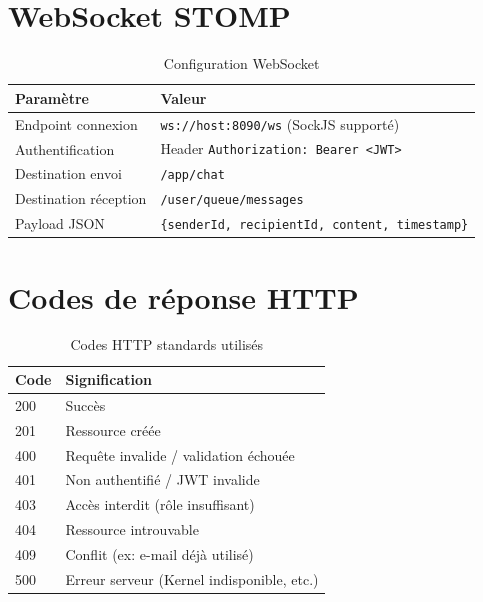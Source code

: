 \section{WebSocket STOMP}

\begin{table}[h]
  \centering
  \caption{Configuration WebSocket}
  \label{tab:websocket}
  \begin{tabular}{@{}ll@{}}
    \toprule
    \textbf{Paramètre} & \textbf{Valeur} \\
    \midrule
    Endpoint connexion   & \texttt{ws://host:8090/ws} (SockJS supporté) \\
    Authentification     & Header \texttt{Authorization: Bearer <JWT>} \\
    Destination envoi    & \texttt{/app/chat} \\
    Destination réception & \texttt{/user/queue/messages} \\
    Payload JSON         & \texttt{\{senderId, recipientId, content, timestamp\}} \\
    \bottomrule
  \end{tabular}
\end{table}

\section{Codes de réponse HTTP}

\begin{table}[h]
  \centering
  \caption{Codes HTTP standards utilisés}
  \label{tab:http-codes}
  \begin{tabular}{@{}ll@{}}
    \toprule
    \textbf{Code} & \textbf{Signification} \\
    \midrule
    200 & Succès \\
    201 & Ressource créée \\
    400 & Requête invalide / validation échouée \\
    401 & Non authentifié / JWT invalide \\
    403 & Accès interdit (rôle insuffisant) \\
    404 & Ressource introuvable \\
    409 & Conflit (ex: e-mail déjà utilisé) \\
    500 & Erreur serveur (Kernel indisponible, etc.) \\
    \bottomrule
  \end{tabular}
\end{table}
